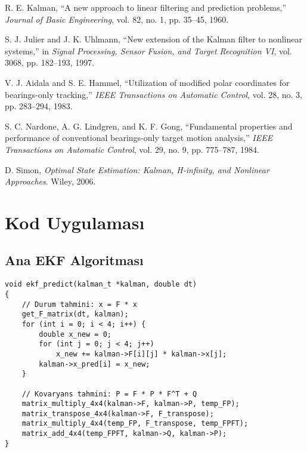 \documentclass[12pt,a4paper]{article}
\begin{document}

\begin{thebibliography}{10}

R. E. Kalman, ``A new approach to linear filtering and prediction problems,'' \emph{Journal of Basic Engineering}, vol. 82, no. 1, pp. 35--45, 1960.

S. J. Julier and J. K. Uhlmann, ``New extension of the Kalman filter to nonlinear systems,'' in \emph{Signal Processing, Sensor Fusion, and Target Recognition VI}, vol. 3068, pp. 182--193, 1997.

V. J. Aidala and S. E. Hammel, ``Utilization of modified polar coordinates for bearings-only tracking,'' \emph{IEEE Transactions on Automatic Control}, vol. 28, no. 3, pp. 283--294, 1983.

S. C. Nardone, A. G. Lindgren, and K. F. Gong, ``Fundamental properties and performance of conventional bearings-only target motion analysis,'' \emph{IEEE Transactions on Automatic Control}, vol. 29, no. 9, pp. 775--787, 1984.

D. Simon, \emph{Optimal State Estimation: Kalman, H-infinity, and Nonlinear Approaches}. Wiley, 2006.

\end{thebibliography}

\newpage
\appendix

\section{Kod Uygulaması}

\subsection{Ana EKF Algoritması}
\begin{lstlisting}[caption=Genişletilmiş Kalman Filtresi Uygulaması]
void ekf_predict(kalman_t *kalman, double dt)
{
    // Durum tahmini: x = F * x
    get_F_matrix(dt, kalman);
    for (int i = 0; i < 4; i++) {
        double x_new = 0;
        for (int j = 0; j < 4; j++)
            x_new += kalman->F[i][j] * kalman->x[j];
        kalman->x_pred[i] = x_new;
    }
    
    // Kovaryans tahmini: P = F * P * F^T + Q
    matrix_multiply_4x4(kalman->F, kalman->P, temp_FP);
    matrix_transpose_4x4(kalman->F, F_transpose);
    matrix_multiply_4x4(temp_FP, F_transpose, temp_FPFT);
    matrix_add_4x4(temp_FPFT, kalman->Q, kalman->P);
}
\end{lstlisting}
\end{document}
